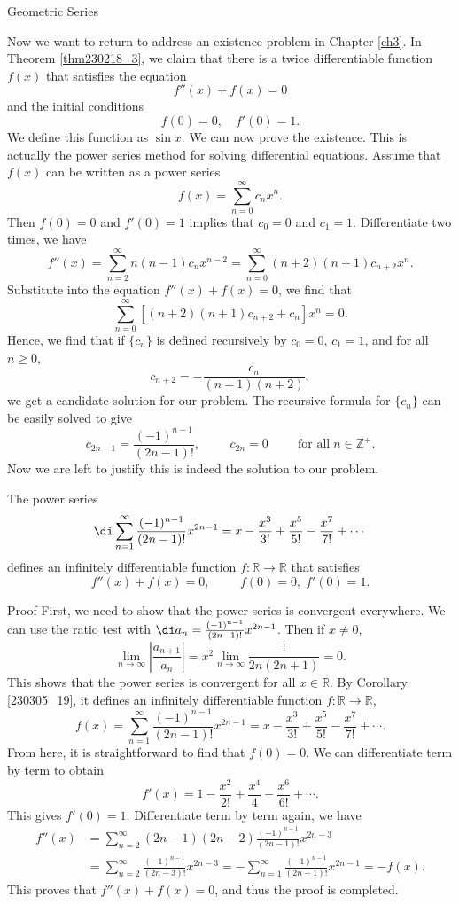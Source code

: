 \begin{example}[label=230305_16]{Geometric Series}
\begin{example}[label=230304_9]{}
\begin{example}{}
Now we want to return to address an existence problem in Chapter \ref{ch3}. In Theorem \ref{thm230218_3}, we claim that  there is a twice differentiable function $f(x)$ that satisfies the equation
\[f''(x)+f(x)=0\] and the initial conditions
\[f(0)=0,\quad f'(0)=1.\]
We define this function as $\sin x$. 
We can now prove the existence. This is actually the power series method for solving differential equations.
Assume that $f(x)$ can be written as a power series 
\[f(x)=\sum_{n=0}^{\infty}c_nx^n.\]
Then $f(0)=0$ and $f'(0)=1$ implies that $c_0=0$ and $c_1=1$. Differentiate two times, we have
\[f''(x)=\sum_{n=2}^{\infty}n(n-1)c_nx^{n-2}=\sum_{n=0}^{\infty}(n+2)(n+1)c_{n+2}x^n.\]
Substitute into the equation $f''(x)+f(x)=0$, we find that
\[\sum_{n=0}^{\infty}\left[(n+2)(n+1)c_{n+2}+c_n\right]x^n=0.\]
Hence, we find that if $\{c_n\}$ is defined recursively by $c_0=0$, $c_1=1$, and for all $n\geq 0$,
\[c_{n+2}=-\frac{c_n}{(n+1)(n+2)},\] we get a candidate solution for our problem.  The recursive formula for $\{c_n\}$ can be easily solved to give
\[c_{2n-1}=\frac{(-1)^{n-1}}{(2n-1)!},\hspace{1cm}c_{2n}=0\hspace{1cm}\text{for all}\;n\in\mathbb{Z}^+.\]Now we are left to justify this is indeed the solution to our problem.
\begin{theorem}{}
The power series \[\di\sum_{n=1}^{\infty} \frac{(-1)^{n-1}}{(2n-1)!}x^{2n-1}=x-\frac{x^3}{3!}+\frac{x^5}{5!}-\frac{x^7}{7!}+\cdots\] defines an infinitely differentiable function $f:\mathbb{R}\to\mathbb{R}$ that satisfies  
\[f''(x)+f(x)=0, \hspace{1cm}f(0)=0, \;f'(0)=1.\] 
\end{theorem}
\begin{myproof}{Proof}
First, we need to show that the power series is convergent everywhere. We can use the ratio test with $\di a_n=\frac{(-1)^{n-1}}{(2n-1)!}x^{2n-1}$. Then if $x\neq 0$, 
\[\lim_{n\to\infty}\left|\frac{a_{n+1}}{a_n}\right|=x^2\lim_{n\to\infty}\frac{1}{2n(2n+1)}=0.\]
This shows that the power series is convergent for all $x\in\mathbb{R}$. By Corollary \ref{230305_19}, it defines an infinitely differentiable function $f:\mathbb{R}\to\mathbb{R}$,
\[f(x)=\sum_{n=1}^{\infty} \frac{(-1)^{n-1}}{(2n-1)!}x^{2n-1}=x-\frac{x^3}{3!}+\frac{x^5}{5!}-\frac{x^7}{7!}+\cdots.\]From here, it is straightforward to find that $f(0)=0$.
 We can differentiate term by term to obtain
\[f'(x)=1-\frac{x^2}{2!}+\frac{x^4}{4}-\frac{x^6}{6!}+\cdots.\]This gives $f'(0)=1$. Differentiate term by term again, we have
\begin{align*}f''(x)&=\sum_{n=2}^{\infty} (2n-1)(2n-2)\frac{(-1)^{n-1}}{(2n-1)!}x^{2n-3}\\&=\sum_{n=2}^{\infty}  \frac{(-1)^{n-1}}{(2n-3)!}x^{2n-3}=- \sum_{n=1}^{\infty} \frac{(-1)^{n-1}}{(2n-1)!}x^{2n-1}=-f(x).\end{align*}This proves that $f''(x)+f(x)=0$, and thus the proof is completed.
\end{myproof}


\end{example}
\end{example}
\end{example}
